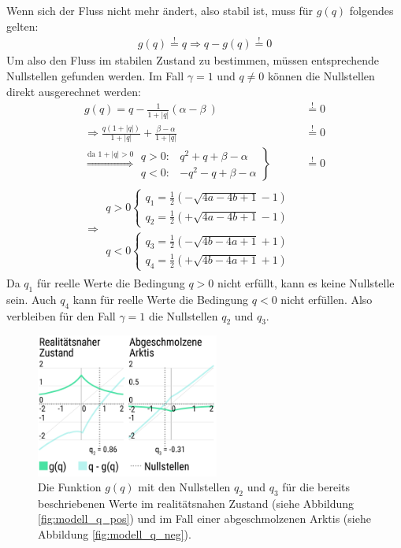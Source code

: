 \documentclass[a4paper,twoside]{article}
\begin{document}
	Wenn sich der Fluss nicht mehr ändert, also stabil ist, muss für \(g(q)\) folgendes gelten:
	\begin{align*}
		g(q) \stackrel{!}{=} q \Rightarrow q - g(q) \stackrel{!}{=} 0
	\end{align*}
	Um also den Fluss im stabilen Zustand zu bestimmen, müssen entsprechende Nullstellen gefunden werden. Im Fall \(\gamma = 1\) und \(q \neq 0\) können die Nullstellen direkt ausgerechnet werden:
	\begin{align*}
		g(q) = q - \frac{1}{1 + |q|}  \left(\alpha - \beta\ \right) &\stackrel{!}{=} 0 \\
		\Rightarrow \frac{q \left( 1 + |q| \right)}{1 + |q|} + \frac{\beta - \alpha}{1 + |q|}  &\stackrel{!}{=} 0 \\
		\stackrel{\textrm{da } 1 + |q| > 0}{\Rightarrow} \left. \begin{array}{ll}
			q > 0: & q^2 + q + \beta - \alpha \\
			q < 0: & -q^2 - q + \beta - \alpha
		\end{array} \right\} &\stackrel{!}{=} 0 \\
		\Rightarrow \begin{array}{l}
			q > 0 \left\{ \begin{array}{l}
				q_1 = \frac{1}{2}\left( -\sqrt{4a - 4b + 1} -1 \right)	\\			
				q_2 = \frac{1}{2}\left( +\sqrt{4a - 4b + 1} -1 \right)				
			\end{array}\right. \\
			q < 0 \left\{ \begin{array}{l}
				q_3 = \frac{1}{2}\left( -\sqrt{4b - 4a + 1} + 1 \right) \\
				q_4 = \frac{1}{2}\left( +\sqrt{4b - 4a + 1} + 1 \right)
			\end{array}\right.
		\end{array}
	\end{align*}
	Da \(q_1\) für reelle Werte die Bedingung \(q > 0\) nicht erfüllt, kann es keine Nullstelle sein. Auch \(q_4\) kann für reelle Werte die Bedingung \(q < 0\) nicht erfüllen. Also verbleiben für den Fall \(\gamma = 1\) die Nullstellen \(q_2\) und \(q_3\).
	
	\begin{figure}[!h]
  		\centering
 		\includegraphics[width=6cm]{../Diagramme/g_von_q_gamma_1.png}
  		\caption{Die Funktion \(g(q)\) mit den Nullstellen \(q_2\) und \(q_3\) für die bereits beschriebenen Werte im realitätsnahen Zustand (siehe Abbildung \ref{fig:modell_q_pos}) und im Fall einer abgeschmolzenen Arktis (siehe Abbildung \ref{fig:modell_q_neg}).}
  		\label{fig:g_von_q_gamma_1}
	\end{figure}	
\end{document}
